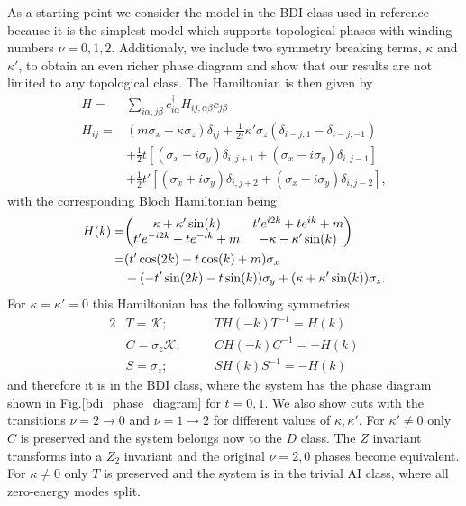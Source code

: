 \documentclass[twocolumn,amsmath,longbibliography,amssymb,superscriptaddress]{revtex4-1}
\begin{document}
As a starting point we consider the model in the BDI class used in reference \cite{Song2014} because it is the simplest model which supports topological phases with winding numbers $\nu = 0,1,2$. Additionaly, we include two symmetry breaking terms, $\kappa$ and $\kappa'$, to obtain an even richer phase diagram and show that our results are not limited to any topological class. The Hamiltonian is then given by
\begin{align}
H =& \sum_{i\alpha,j\beta} c_{i\alpha}^\dagger H_{ij,\alpha \beta} c_{j\beta} \\
H_{ij} =& (m \sigma_x + \kappa \sigma_z)\delta_{ij}  + \frac{1}{2i}\kappa'\sigma_z (\delta_{i-j,1}-\delta_{i-j,-1})\\
&+ \frac{1}{2} t \left[(\sigma_x + i \sigma_y)\delta_{i,j+1} + (\sigma_x - i \sigma_y) \delta_{i,j-1} \right] \\
&+  \frac{1}{2} t' \left[(\sigma_x + i \sigma_y)\delta_{i,j+2} + (\sigma_x - i \sigma_y) \delta_{i,j-2} \right],
\label{bdi_model}
\end{align}
with the corresponding Bloch Hamiltonian being
\begin{align*}
H(k)=&\mqty( \kappa + \kappa' \sin(k) & t' e^{i2k} + t e^{ik}+m \\t' e^{-i2k} + t e^{-ik}+m & -\kappa-\kappa' \sin(k)  ) \\
=& (t' \cos(2k)+t\cos(k)+m)\sigma_x \\
&+ (-t' \sin(2k)-t\sin(k))\sigma_y + (\kappa+\kappa'\sin(k)) \sigma_z.
\end{align*}
For $\kappa = \kappa' = 0$ this Hamiltonian has the following symmetries
\begin{alignat*}{2}
&T = \mathcal{K} ; \quad &&T H(-k) T^{-1} = H(k) \\
&C = \sigma_z\mathcal{K} ; \quad &&C H(-k) C^{-1} = -H(k) \\
&S = \sigma_z ; \quad &&S H(k)S^{-1} = -H(k) 
\end{alignat*}
and therefore it is in the BDI class, where the system has the phase diagram shown in Fig.\ref{bdi_phase_diagram} for $t=0,1$. We also show cuts with the transitions $\nu = 2 \rightarrow 0$ and $\nu = 1 \rightarrow 2$ for different values of $\kappa,\kappa'$.  For $\kappa' \neq 0$ only $C$ is preserved and the system belongs now to the $D$ class. The $Z$ invariant transforms into a $Z_2$ invariant and the original $\nu = 2,0$ phases become equivalent. For $\kappa \neq 0$ only $T$ is preserved and the system is in the trivial AI class, where all zero-energy modes split.
\end{document}
